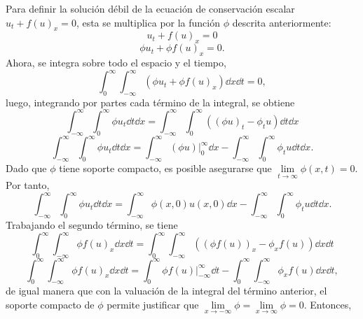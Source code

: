 Para definir la solución débil de la ecuación de conservación escalar $u_t + f(u)_x = 0$, esta se multiplica por la función $\phi$ descrita anteriormente:
\begin{equation}
	u_t + f(u)_x = 0
	\label{eq:conser-u}
\end{equation}
\begin{equation}
	\phi u_t + \phi f(u)_x = 0.
\end{equation}
Ahora, se integra sobre todo el espacio y el tiempo,
\begin{equation}
	\int_{0}^{\infty}\int_{-\infty}^{\infty}\left(\phi u_t + \phi f(u)_x\right) \dd{x}\dd{t} = 0,
\end{equation}
luego, integrando por partes cada término de la integral, se obtiene
\begin{equation}
	\int_{-\infty}^{\infty}\int_{0}^{\infty} \phi u_t \dd{t}\dd{x} = \int_{-\infty}^{\infty}\int_{0}^{\infty} \left((\phi u)_t - \phi_t u\right) \dd{t}\dd{x}
\end{equation}
\begin{equation}
	\int_{-\infty}^{\infty}\int_{0}^{\infty} \phi u_t \dd{t}\dd{x} = \int_{-\infty}^{\infty} (\phi u) \Big|_{0}^{\infty}\dd{x} - \int_{-\infty}^{\infty}\int_{0}^{\infty}\phi_t u \dd{t}\dd{x}.
\end{equation}
Dado que $\phi$ tiene soporte compacto, es posible asegurarse que $\lim\limits_{t\rightarrow \infty}\phi(x,t) = 0$. Por tanto,
\begin{equation}
	\int_{-\infty}^{\infty}\int_{0}^{\infty} \phi u_t \dd{t}\dd{x} = 
	\int_{-\infty}^{\infty} \phi(x,0)u(x,0) \dd{x} - \int_{-\infty}^{\infty}\int_{0}^{\infty}\phi_t u \dd{t}\dd{x}.
\end{equation}
Trabajando el segundo término, se tiene
\begin{equation}
	\int_{0}^{\infty}\int_{-\infty}^{\infty}  \phi f(u)_x \dd{x}\dd{t} = 
	\int_{0}^{\infty}\int_{-\infty}^{\infty} \left((\phi f(u))_x - \phi_x f(u)\right) \dd{x}\dd{t}
\end{equation}
\begin{equation}
	\int_{0}^{\infty}\int_{-\infty}^{\infty}  \phi f(u)_x \dd{x}\dd{t} = 
	\int_{0}^{\infty} \phi f(u) \Big|_{-\infty}^{\infty} \dd{t}  - \int_{0}^{\infty}\int_{-\infty}^{\infty} \phi_x f(u) \dd{x}\dd{t},
\end{equation}
de igual manera que con la valuación de la integral del término anterior, el soporte compacto de $\phi$ permite justificar que $\lim\limits_{x\rightarrow -\infty}\phi = \lim\limits_{x\rightarrow \infty}\phi = 0$. Entonces,
